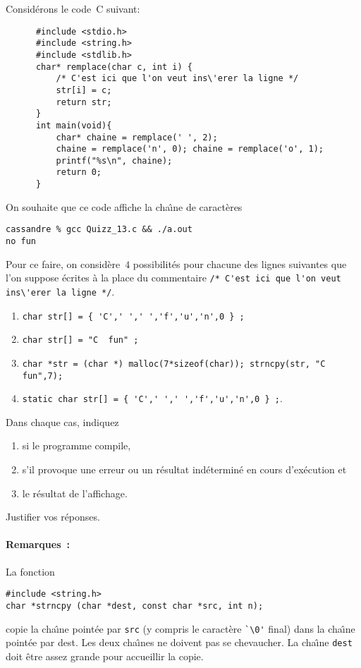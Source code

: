 Consid\'erons le code~C suivant:
\begin{verbatim}
      #include <stdio.h>
      #include <string.h>
      #include <stdlib.h>
      char* remplace(char c, int i) {
          /* C'est ici que l'on veut ins\'erer la ligne */
          str[i] = c;
          return str;
      }
      int main(void){
          char* chaine = remplace(' ', 2); 
          chaine = remplace('n', 0); chaine = remplace('o', 1);
          printf("%s\n", chaine);
          return 0;
      }
\end{verbatim}
On souhaite que ce code affiche la cha\^\i{}ne de caract\`eres
\begin{verbatim}
cassandre % gcc Quizz_13.c && ./a.out
no fun
\end{verbatim}
Pour ce faire, on consid\`ere~$4$ possibilit\'es pour chacune des
lignes suivantes que l'on suppose \'ecrites \`a la place du
commentaire %
\verb+/* C'est ici que l'on veut ins\'erer la ligne */+.
\begin{enumerate}
\item \verb+char str[] = { 'C',' ',' ','f','u','n',0 } ;+
\item \verb+char str[] = "C  fun" ;+
\item \verb+char *str = (char *) malloc(7*sizeof(char)); strncpy(str, "C  fun",7);+
\item \verb+static char str[] = { 'C',' ',' ','f','u','n',0 } ;+.
\end{enumerate}
Dans chaque cas, indiquez
\begin{enumerate}
\item si le programme compile,
\item s'il provoque une
  erreur ou un r\'esultat ind\'etermin\'e en cours d'ex\'ecution et
\item le r\'esultat de l'affichage.
\end{enumerate}
Justifier vos r\'eponses.
\paragraph{Remarques~:}
La fonction
\begin{verbatim}
#include <string.h>
char *strncpy (char *dest, const char *src, int n);
\end{verbatim}
copie la cha\^\i{}ne point\'ee par \verb+src+ (y compris le caract\`ere \verb+`\0'+
final) dans la cha\^\i{}ne point\'ee par dest. Les deux cha\^\i{}nes
ne doivent pas se chevaucher. La cha\^\i{}ne \verb+dest+ doit \^etre assez
grande pour accueillir la copie.

